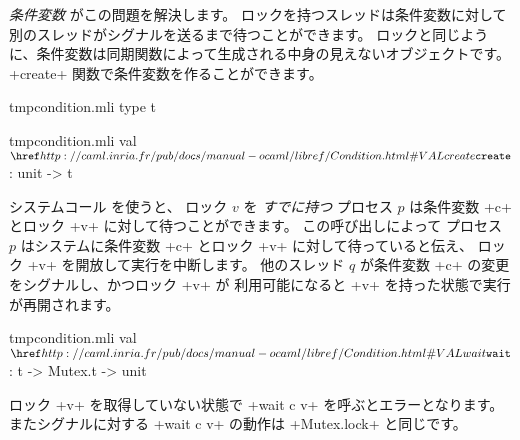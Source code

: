 \emph{条件変数} がこの問題を解決します。
ロックを持つスレッドは条件変数に対して別のスレッドがシグナルを送るまで待つことができます。
ロックと同じように、条件変数は同期関数によって生成される中身の見えないオブジェクトです。
\ml+create+ 関数で条件変数を作ることができます。
%
\begin{codefile}{tmpcondition.mli}
type t
\end{codefile}
%
\begin{listingcodefile}{tmpcondition.mli}
val $\libvalue{Condition}{create}$ : unit -> t
\end{listingcodefile}
%
システムコール  を使うと、
ロック $v$ を \emph{すでに持つ} プロセス $p$ は条件変数 \ml+c+ とロック \ml+v+
に対して待つことができます。
この呼び出しによって プロセス $p$ はシステムに条件変数 \ml+c+ とロック \ml+v+ に対して待っていると伝え、
ロック \ml+v+ を開放して実行を中断します。
他のスレッド $q$ が条件変数 \ml+c+ の変更をシグナルし、かつロック \ml+v+ が
利用可能になると \ml+v+ を持った状態で実行が再開されます。
%
\begin{listingcodefile}{tmpcondition.mli}
val $\libvalue{Condition}{wait}$ : t -> Mutex.t -> unit
\end{listingcodefile}
%
ロック \ml+v+ を取得していない状態で \ml+wait c v+ を呼ぶとエラーとなります。
またシグナルに対する \ml+wait c v+ の動作は \ml+Mutex.lock+ と同じです。


